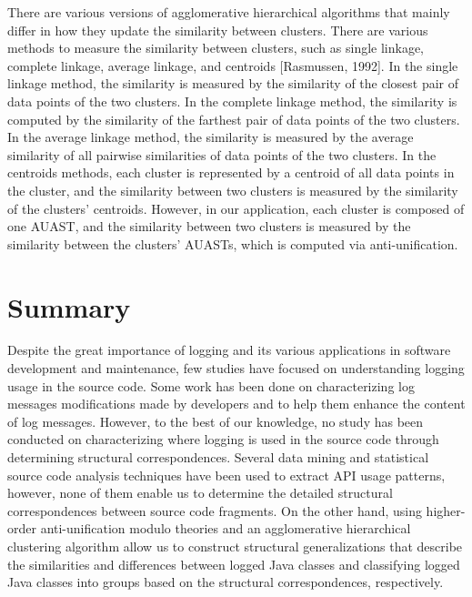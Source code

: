 There are various versions of agglomerative hierarchical algorithms that mainly differ in how they update the similarity between clusters. There are various methods to measure the similarity between clusters, such as single linkage, complete linkage, average linkage, and centroids [Rasmussen, 1992]. In the single linkage method, the similarity is measured by the similarity of the closest pair of data points of the two clusters. In the complete linkage method, the similarity is computed by the similarity of the farthest pair of data points of the two clusters. In the average linkage method, the similarity is measured by the average similarity of all pairwise similarities of data points of the two clusters. In the centroids methods, each cluster is represented by a centroid of all data points in the cluster, and the similarity between two clusters is measured by the similarity of the clusters' centroids.
However, in our application, each cluster is composed of one AUAST, and the similarity between two clusters is measured by the similarity between the clusters' AUASTs, which is computed via anti-unification.

\section{Summary}  \label{back-summary}

Despite the great importance of logging and its various applications in software development and maintenance, few studies have focused on understanding logging usage in the source code.
Some work has been done on characterizing log messages modifications made by developers and to help them enhance the content of log messages. However, to the best of our knowledge, no study has been conducted on characterizing where logging is used in the source code through determining structural correspondences. Several data mining and statistical source code analysis techniques have been used to extract API usage patterns, however, none of them enable us to determine the detailed structural correspondences between source code fragments. On the other hand, using higher-order anti-unification modulo theories and an agglomerative hierarchical clustering algorithm allow us to construct structural generalizations that describe the similarities and differences between logged Java classes and classifying logged Java classes into groups based on the structural correspondences, respectively.

